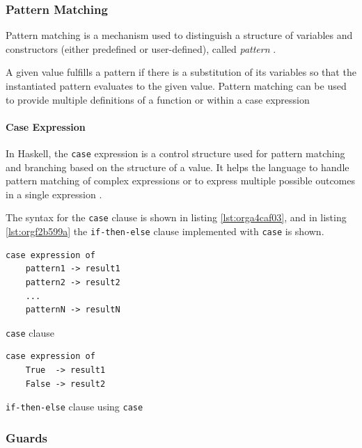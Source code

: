 \documentclass[a4paper, titlepage, twoside]{article}
\begin{document}
\subsubsection{Pattern Matching}
\label{sec:orgbc826fb}

Pattern matching is a mechanism used to distinguish a structure of variables and constructors (either predefined or user-defined), called \emph{pattern} \autocite[chapter 3.17]{marlowHaskell2010Language2010}.

A given value fulfills a pattern if there is a substitution of its variables so that the instantiated pattern evaluates to the given value. Pattern matching can be used to provide multiple definitions of a function or within a case expression

\paragraph*{Case Expression}
\label{sec:orgb6422d0}

In Haskell, the \texttt{case} expression is a control structure used for pattern matching and branching based on the structure of a value. It helps the language to handle pattern matching of complex expressions or to express multiple possible outcomes in a single expression \autocite{kremerCPSC449Programming2015}.

The syntax for the \texttt{case} clause is shown in listing \ref{lst:orga4caf03}, and in listing \ref{lst:orgf2b599a} the \texttt{if-then-else} clause implemented with \texttt{case} is shown.

\begin{listing}[htbp]
\begin{verbatim}
case expression of
    pattern1 -> result1
    pattern2 -> result2
    ...
    patternN -> resultN
\end{verbatim}
\caption{\label{lst:orga4caf03}\texttt{case} clause}
\end{listing}

\begin{listing}[htbp]
\begin{verbatim}
case expression of
    True  -> result1
    False -> result2
\end{verbatim}
\caption{\label{lst:orgf2b599a}\texttt{if-then-else} clause using \texttt{case}}
\end{listing}

\subsubsection{Guards}
\label{sec:org7bd75c9}
\end{document}

